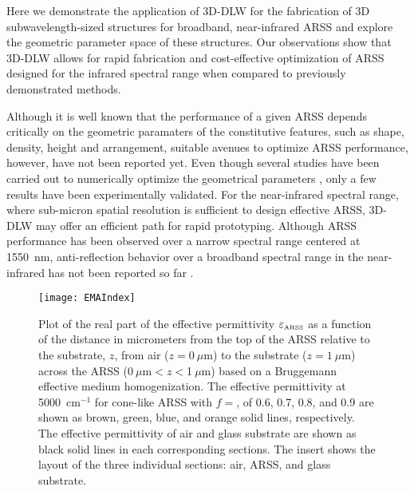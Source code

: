 \documentclass[9pt,twocolumn,twoside]{osajnl}
\newcommand{\sss}{\scriptscriptstyle}
\newcommand{\sst}{\scriptstyle}
\newcommand{\stext}[1]{\sss \text{#1} \sst}
\begin{document}
Here we demonstrate the application of 3D-DLW for the fabrication of 3D subwavelength-sized structures for broadband, near-infrared ARSS and explore the geometric parameter space of these structures. Our observations show that 3D-DLW allows for rapid fabrication and cost-effective optimization of ARSS designed for the infrared spectral range when compared to previously demonstrated methods.   

Although it is well known that the performance of a given ARSS depends critically on the geometric paramaters of the constitutive features, such as shape, density, height and arrangement, suitable avenues to optimize ARSS performance, however, have not been reported yet. Even though several studies have been carried out to numerically optimize the geometrical parameters \cite{weiblen2016optimized}, only a few results have been experimentally validated. For the near-infrared spectral range, where sub-micron spatial resolution is sufficient to design effective ARSS, 3D-DLW may offer an efficient path for rapid prototyping. Although ARSS performance has been observed over a narrow spectral range centered at 1550~nm, anti-reflection behavior over a broadband spectral range in the near-infrared has not been reported so far \cite{kowalczyk2014microstructured}. 

\begin{figure}[hbt]
	\centering
	\vspace{-0.35cm}
	\texttt{[image: EMAIndex]}
	\caption{Plot of the real part of the effective permittivity $\varepsilon_{\stext{ARSS}}$ as a function of the distance in micrometers from the top of the ARSS relative to the substrate, $z$, from air ($z=0\ \mu$m) to the substrate ($z=1\ \mu$m) across the ARSS ($0\ \mu$m$<z<$1$\ \mu$m) based on a Bruggemann effective medium homogenization. The effective permittivity at 5000~cm$ ^{-1} $ for cone-like ARSS with $f=$, of 0.6, 0.7, 0.8, and 0.9 are shown as brown, green, blue, and orange solid lines, respectively.  The effective permittivity of air and glass substrate are shown as black solid lines in each corresponding sections. The insert shows the layout of the three individual sections: air, ARSS, and glass substrate. }
	\label{fig:EMAIndex}
\end{figure} 
\end{document}
